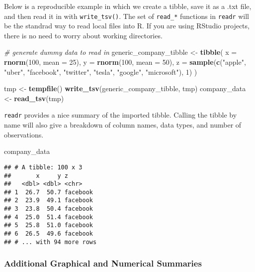 \documentclass[]{book}
\newenvironment{Shaded}{\begin{snugshade}}{\end{snugshade}}
\newcommand{\CommentTok}[1]{\textcolor[rgb]{0.56,0.35,0.01}{\textit{#1}}}
\newcommand{\DataTypeTok}[1]{\textcolor[rgb]{0.13,0.29,0.53}{#1}}
\newcommand{\DecValTok}[1]{\textcolor[rgb]{0.00,0.00,0.81}{#1}}
\newcommand{\KeywordTok}[1]{\textcolor[rgb]{0.13,0.29,0.53}{\textbf{#1}}}
\newcommand{\NormalTok}[1]{#1}
\newcommand{\StringTok}[1]{\textcolor[rgb]{0.31,0.60,0.02}{#1}}
\begin{document}
Below is a reproducible example in which we create a tibble, save it as a .txt file, and then read it in with \texttt{write\_tsv()}. The set of \texttt{read\_*} functions in \texttt{readr} will be the standrad way to read local files into R. If you are using RStudio projects, there is no need to worry about working directories.

\begin{Shaded}
\begin{Highlighting}[]
\CommentTok{# generate dummy data to read in}
\NormalTok{generic_company_tibble <-}\StringTok{ }\KeywordTok{tibble}\NormalTok{(}
  \DataTypeTok{x =} \KeywordTok{rnorm}\NormalTok{(}\DecValTok{100}\NormalTok{, }\DataTypeTok{mean =} \DecValTok{25}\NormalTok{),}
  \DataTypeTok{y =} \KeywordTok{rnorm}\NormalTok{(}\DecValTok{100}\NormalTok{, }\DataTypeTok{mean =} \DecValTok{50}\NormalTok{),}
  \DataTypeTok{z =} \KeywordTok{sample}\NormalTok{(}\KeywordTok{c}\NormalTok{(}\StringTok{"apple"}\NormalTok{, }\StringTok{"uber"}\NormalTok{, }\StringTok{"facebook"}\NormalTok{, }\StringTok{"twitter"}\NormalTok{, }\StringTok{"tesla"}\NormalTok{, }\StringTok{"google"}\NormalTok{, }\StringTok{"microsoft"}\NormalTok{), }\DecValTok{1}\NormalTok{)}
\NormalTok{)}

\NormalTok{tmp <-}\StringTok{ }\KeywordTok{tempfile}\NormalTok{()}
\KeywordTok{write_tsv}\NormalTok{(generic_company_tibble, tmp)}
\NormalTok{company_data <-}\StringTok{ }\KeywordTok{read_tsv}\NormalTok{(tmp)}
\end{Highlighting}
\end{Shaded}

\texttt{readr} provides a nice summary of the imported tibble. Calling the tibble by name will also give a breakdown of column names, data types, and number of observations.

\begin{Shaded}
\begin{Highlighting}[]
\NormalTok{company_data}
\end{Highlighting}
\end{Shaded}

\begin{verbatim}
## # A tibble: 100 x 3
##       x     y z       
##   <dbl> <dbl> <chr>   
## 1  26.7  50.7 facebook
## 2  23.9  49.1 facebook
## 3  23.8  50.4 facebook
## 4  25.0  51.4 facebook
## 5  25.8  51.0 facebook
## 6  26.5  49.6 facebook
## # ... with 94 more rows
\end{verbatim}

\hypertarget{additional-graphical-and-numerical-summaries}{%
\subsubsection{Additional Graphical and Numerical Summaries}\label{additional-graphical-and-numerical-summaries}}
\end{document}
